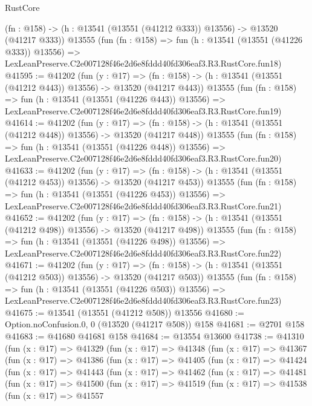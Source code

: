 \begin{lexlean}{RustCore}
\begin{coremodule}
    (fn : @158) -> (h : @13541 (@13551 (@41212 @333)) @13556) -> @13520 (@41217 @333))
    @13555
    (fun (fn : @158) =>
    fun (h : @13541 (@13551 (@41226 @333)) @13556) =>
    LexLeanPreserve.C2e007128f46e2d6e8fddd40fd306eaf3.R3.RustCore.fun18)
@41595 := @41202
    (fun (y : @17) =>
    (fn : @158) -> (h : @13541 (@13551 (@41212 @443)) @13556) -> @13520 (@41217 @443))
    @13555
    (fun (fn : @158) =>
    fun (h : @13541 (@13551 (@41226 @443)) @13556) =>
    LexLeanPreserve.C2e007128f46e2d6e8fddd40fd306eaf3.R3.RustCore.fun19)
@41614 := @41202
    (fun (y : @17) =>
    (fn : @158) -> (h : @13541 (@13551 (@41212 @448)) @13556) -> @13520 (@41217 @448))
    @13555
    (fun (fn : @158) =>
    fun (h : @13541 (@13551 (@41226 @448)) @13556) =>
    LexLeanPreserve.C2e007128f46e2d6e8fddd40fd306eaf3.R3.RustCore.fun20)
@41633 := @41202
    (fun (y : @17) =>
    (fn : @158) -> (h : @13541 (@13551 (@41212 @453)) @13556) -> @13520 (@41217 @453))
    @13555
    (fun (fn : @158) =>
    fun (h : @13541 (@13551 (@41226 @453)) @13556) =>
    LexLeanPreserve.C2e007128f46e2d6e8fddd40fd306eaf3.R3.RustCore.fun21)
@41652 := @41202
    (fun (y : @17) =>
    (fn : @158) -> (h : @13541 (@13551 (@41212 @498)) @13556) -> @13520 (@41217 @498))
    @13555
    (fun (fn : @158) =>
    fun (h : @13541 (@13551 (@41226 @498)) @13556) =>
    LexLeanPreserve.C2e007128f46e2d6e8fddd40fd306eaf3.R3.RustCore.fun22)
@41671 := @41202
    (fun (y : @17) =>
    (fn : @158) -> (h : @13541 (@13551 (@41212 @503)) @13556) -> @13520 (@41217 @503))
    @13555
    (fun (fn : @158) =>
    fun (h : @13541 (@13551 (@41226 @503)) @13556) =>
    LexLeanPreserve.C2e007128f46e2d6e8fddd40fd306eaf3.R3.RustCore.fun23)
@41675 := @13541 (@13551 (@41212 @508)) @13556
@41680 := Option.noConfusion.{0, 0} (@13520 (@41217 @508)) @158
@41681 := @2701 @158
@41683 := @41680 @41681 @158
@41684 := @13554 @13600
@41738 := @41310
    (fun (x : @17) =>
    @41329
      (fun (x : @17) =>
      @41348
        (fun (x : @17) =>
        @41367
          (fun (x : @17) =>
          @41386
            (fun (x : @17) =>
            @41405
              (fun (x : @17) =>
              @41424
                (fun (x : @17) =>
                @41443
                  (fun (x : @17) =>
                  @41462
                    (fun (x : @17) =>
                    @41481
                      (fun (x : @17) =>
                      @41500
                        (fun (x : @17) =>
                        @41519
                          (fun (x : @17) =>
                          @41538
                            (fun (x : @17) =>
                            @41557

\end{coremodule}
\end{lexlean}
